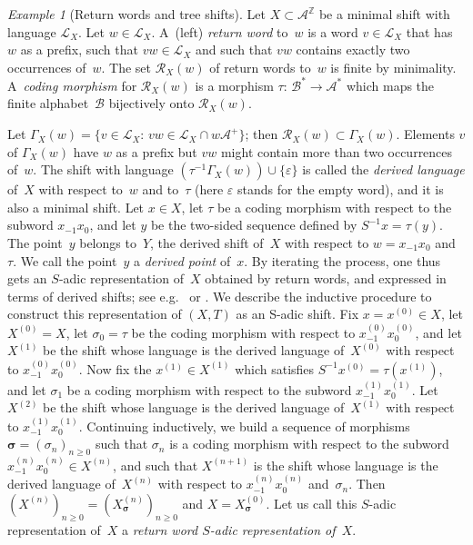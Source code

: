 \documentclass{amsart}
\theoremstyle{definition}
\theoremstyle{remark}
\newtheorem{example}[lemma]{Example}
\numberwithin{equation}{section}
\begin{document}
\begin{example}[Return words and tree shifts]
Let $X \subset \mathcal{A}^\mathbb{Z}$ be a minimal shift with language $\mathcal{L}_X$. 
Let $w \in \mathcal{L}_X$. 
A~(left) \emph{return  word} to~$w$ is a word $v \in \mathcal{L}_X$ that has $w$ as a prefix, such that $vw \in \mathcal{L}_X$ and such that $vw$ contains exactly two occurrences of~$w$. 
The set $\mathcal{R}_X(w)$ of return words to~$w$ is finite by minimality. 
A~\emph{coding morphism}  for $\mathcal{R}_X(w)$ is a morphism $\tau:\, \mathcal{B}^* \to  \mathcal{A}^*$ which maps the finite alphabet~$\mathcal{B}$ bijectively onto $\mathcal{R}_X(w)$. 

Let $\Gamma_X(w) = \{v \in  \mathcal{L}_X:\,  vw \in  \mathcal{L}_X \cap w \mathcal{A}^+\}$; then $\mathcal{R}_X(w) \subset  \Gamma_X(w)$. 
Elements $v$ of $\Gamma_X(w)$ have $w$ as a prefix but $vw$ might contain more than two occurrences of~$w$.
The shift with language $(\tau^{-1} \Gamma_X(w) ) \cup \{ \varepsilon\}$ is called the \emph{derived language} of~$X$ with respect to~$w$ and to~$\tau$ (here $\varepsilon$
stands for the empty word), and it is also a minimal shift. 
Let $x \in X$, let $\tau$ be a coding morphism with respect to the subword $x_{-1} x_0$, and 
let $y$ be the two-sided sequence defined by $S^{-1} x  = \tau(y)$. 
The point~$y$ belongs to~$Y$, the derived shift of~$X$ with respect to $w = x_{-1} x_0$ and~$\tau$.
We call the point~$y$ a \emph{derived point} of~$x$.
By iterating the process, one thus gets an $S$-adic representation of~$X$ obtained by return words, and expressed in terms of derived shifts; see e.g.\ \cite{Durand:00b} or  \cite{Durand-Leroy}. 
We describe the inductive procedure to construct this representation of $(X,T)$ as an S-adic shift. 
Fix $x=x^{(0)}\in X$, let $X^{(0)}=X$, let $\sigma_0=\tau$ be the coding morphism with respect to $x_{-1}^{(0)} x_0^{(0)}$, and let $X^{(1)}$ be the shift whose language is the derived language of~$X^{(0)}$ with respect to $x_{-1}^{(0)} x_0^{(0)}$. 
Now fix the $x^{(1)}\in X^{(1)}$ which satisfies $S^{-1} x^{(0)}  = \tau (x^{(1)})$, and let $\sigma_1$ be a coding morphism with respect to the subword $x_{-1}^{(1)}x_0^{(1)}$. 
Let $X^{(2)}$ be the shift whose language is the derived language of~$X^{(1)}$ with respect to $x_{-1}^{(1)}x_0^{(1)}$. 
Continuing inductively, we build a sequence of morphisms $\boldsymbol{\sigma} =(\sigma_n)_{n\geq 0}$ such that $\sigma_n$ is a coding morphism with respect to the subword $x_{-1}^{(n)}x_0^{(n)}\in X^{(n)}$,  and such that $X^{(n+1)}$ is the shift whose language is the derived language of~$X^{(n)}$ with respect to $x_{-1}^{(n)}x_0^{(n)}$ and~$\sigma_n$. 
Then $(X^{(n)})_{n\geq 0}=  (X_{\boldsymbol{\sigma}}^{(n)})_{n\geq 0}$ and $X= X_{\boldsymbol{\sigma}}^{(0)}$. 
Let us call this $S$-adic representation of~$X$ a \emph{return word $S$-adic representation of~$X$}.


\end{example}
\end{document}
